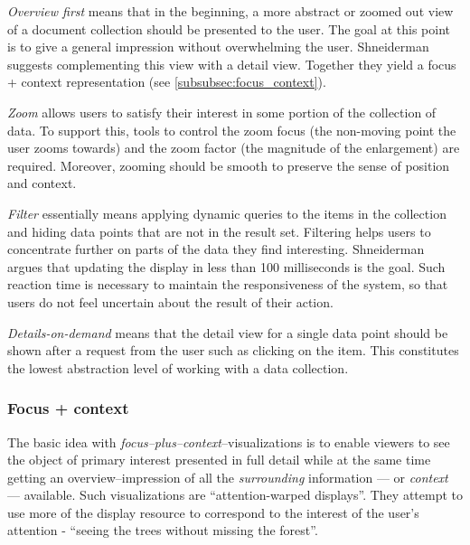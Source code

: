 \textit{Overview first} means that in the beginning, a more abstract or zoomed out view of a document collection should be presented to the user. 
The goal at this point is to give a general impression without overwhelming the user.
Shneiderman \cite{Shneiderman1996} suggests complementing this view with a detail view. Together they yield a focus + context representation (see \autoref{subsubsec:focus_context}).

\textit{Zoom} allows users to satisfy their interest in some portion of the collection of data.
To support this, tools to control the zoom focus (the non-moving point the user zooms towards) and the zoom factor (the magnitude of the enlargement) are required.
Moreover, zooming should be smooth to preserve the sense of position and context.

\textit{Filter} essentially means applying dynamic queries to the items in the collection and hiding data points that are not in the result set. 
Filtering helps users to concentrate further on parts of the data they find interesting.
Shneiderman \cite{Shneiderman1996} argues that updating the display in less than 100 milliseconds is the goal.
Such reaction time is necessary to maintain the responsiveness of the system, so that users do not feel uncertain about the result of their action.

\textit{Details-on-demand} means that the detail view for a single data point should be shown after a request from the user such as clicking on the item. This constitutes the lowest abstraction level of working with a data collection.

\subsubsection{Focus + context}
\label{subsubsec:focus_context}

The basic idea with \textit{focus–plus–context}–visualizations is to enable viewers to see the object of primary interest presented in full detail while at the same time getting an overview–impression of all the \textit{surrounding} information — or \textit{context} — available.
Such visualizations are ``attention-warped displays''.
They attempt to use more of the display resource to correspond to the interest of the user's attention\cite{Card1999} - ``seeing the trees without missing the forest''.

